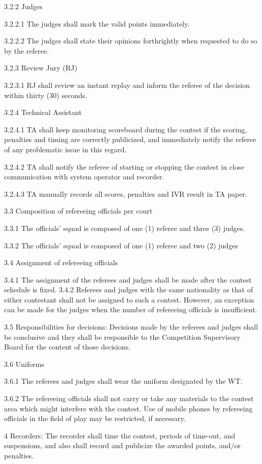 \documentclass[
]{report}
\begin{document}
3.2.2 Judges

3.2.2.1 The judges shall mark the valid points immediately.

3.2.2.2 The judges shall state their opinions forthrightly when
requested to do so by the referee.

3.2.3 Review Jury (RJ)

3.2.3.1 RJ shall review an instant replay and inform the referee of the
decision within thirty (30) seconds.

3.2.4 Technical Assistant

3.2.4.1 TA shall keep monitoring scoreboard during the contest if the
scoring, penalties and timing are correctly publicized, and immediately
notify the referee of any problematic issue in this regard.

3.2.4.2 TA shall notify the referee of starting or stopping the contest
in close communication with system operator and recorder.

3.2.4.3 TA manually records all scores, penalties and IVR result in TA
paper.

3.3 Composition of refereeing officials per court

3.3.1 The officials' squad is composed of one (1) referee and three (3)
judges.

3.3.2 The officials' squad is composed of one (1) referee and two (2)
judges

3.4 Assignment of refereeing officials

3.4.1 The assignment of the referees and judges shall be made after the
contest schedule is fixed. 3.4.2 Referees and judges with the same
nationality as that of either contestant shall not be assigned to such a
contest. However, an exception can be made for the judges when the
number of refereeing officials is insufficient.

3.5 Responsibilities for decisions: Decisions made by the referees and
judges shall be conclusive and they shall be responsible to the
Competition Supervisory Board for the content of those decisions.

3.6 Uniforms

3.6.1 The referees and judges shall wear the uniform designated by the
WT.

3.6.2 The refereeing officials shall not carry or take any materials to
the contest area which might interfere with the contest. Use of mobile
phones by refereeing officials in the field of play may be restricted,
if necessary.

4 Recorders: The recorder shall time the contest, periods of time-out,
and suspensions, and also shall record and publicize the awarded points,
and/or penalties.
\end{document}
